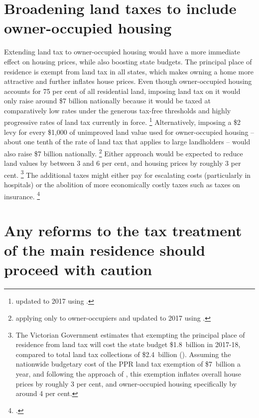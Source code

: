 \section{Broadening land taxes to include owner-occupied housing}\label{sec:broadening-land-taxes-to-include-owner-occupied-housing}

Extending land tax to owner-occupied housing would have a more immediate effect on housing prices, while also boosting state budgets. The principal place of residence is exempt from land tax in all states, which makes owning a home more attractive and further inflates house prices. Even though owner-occupied housing accounts for 75 per cent of all residential land, imposing land tax on it would only raise around \$7 billion nationally because it would be taxed at comparatively low rates under the generous tax-free thresholds and highly progressive rates of land tax currently in force.%
    \footnote{\textcite[][24]{KellyHarrisonHunterEtAl2013} updated to 2017 using \textcite[][Table~61]{ABS-aus-system-of-nat-accounts2016-17}.}
Alternatively, imposing a \$2 levy for every \$1,000 of unimproved land value used for owner-occupied housing -- about one tenth of the rate of land tax that applies to large landholders -- would also raise \$7 billion nationally.%
    \footnote{\textcite[][7]{DaleyCoates-2015-Property-taxes} applying only to owner-occupiers and updated to 2017 using \textcite[][Table~61]{ABS-aus-system-of-nat-accounts2016-17}.}
Either approach would be expected to reduce land values by between 3 and 6 per cent, and housing prices by roughly 3 per cent.%
    \footnote{The Victorian Government estimates that exempting the principal place of residence from land tax will cost the state budget \$1.8~billion in 2017-18, compared to total land tax collections of \$2.4~billion (\textcite[][155,171]{VicDTF-Budget-Paper-No5-2017-18}).
	Assuming the nationwide budgetary cost of the PPR land tax exemption of \$7~billion a year, and following the approach of \textcite[][32]{OrangeBook-2016}, this exemption inflates overall house prices by roughly 3 per cent, and owner-occupied housing specifically by around 4 per cent.} 
The additional taxes might either pay for escalating costs (particularly in hospitals) or the abolition of more economically costly taxes such as taxes on insurance.%
    \footcites{DaleyCoates-2015-Property-taxes}{Freebairn-2017-Reform-options-for-state-property-taxes}

\section{Any reforms to the tax treatment of the main residence should proceed with caution}\label{sec:any-reforms-to-the-capital-gains-tax-exemption-on-the-main-residence-should-proceed-with-caution}

